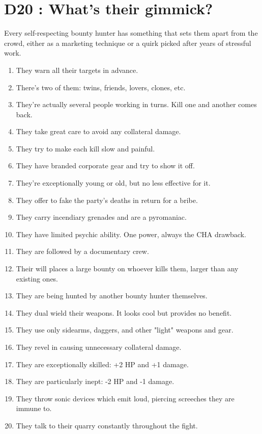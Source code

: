 \documentclass{article}
\begin{document}
\section*{D20 : What's their gimmick?}
Every self-respecting bounty hunter has something that sets them apart from the crowd, either as a marketing technique or a quirk picked after years of stressful work.
\begin{enumerate}
	\item They warn all their targets in advance.
	\item There's two of them: twins, friends, lovers, clones, etc.
	\item They're actually several people working in turns. Kill one and another comes back.
	\item They take great care to avoid any collateral damage.
	\item They try to make each kill slow and painful.
	\item They have branded corporate gear and try to show it off.
	\item They're exceptionally young or old, but no less effective for it.
	\item They offer to fake the party's deaths in return for a bribe.
	\item They carry incendiary grenades and are a pyromaniac.
	\item They have limited psychic ability. One power, always the CHA drawback.
	\item They are followed by a documentary crew.
	\item Their will places a large bounty on whoever kills them, larger than any existing ones.
	\item They are being hunted by another bounty hunter themselves.
	\item They dual wield their weapons. It looks cool but provides no benefit.
	\item They use only sidearms, daggers, and other "light" weapons and gear.
	\item They revel in causing unnecessary collateral damage.
	\item They are exceptionally skilled: +2 HP and +1 damage.
	\item They are particularly inept: -2 HP and -1 damage.
	\item They throw sonic devices which emit loud, piercing screeches they are immune to.
	\item They talk to their quarry constantly throughout the fight.
\end{enumerate}
\end{document}
